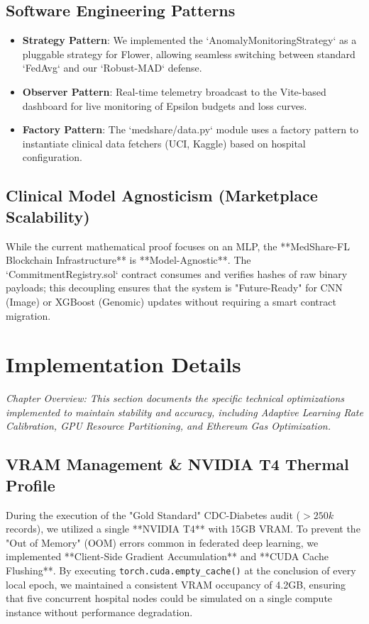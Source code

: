 \documentclass[10pt, a4paper, twocolumn]{article}
\begin{document}
\subsection{Software Engineering Patterns}
\begin{itemize}
    \item \textbf{Strategy Pattern}: We implemented the `AnomalyMonitoringStrategy` as a pluggable strategy for Flower, allowing seamless switching between standard `FedAvg` and our `Robust-MAD` defense.
    \item \textbf{Observer Pattern}: Real-time telemetry broadcast to the Vite-based dashboard for live monitoring of Epsilon budgets and loss curves.
    \item \textbf{Factory Pattern}: The `medshare/data.py` module uses a factory pattern to instantiate clinical data fetchers (UCI, Kaggle) based on hospital configuration.
\end{itemize}

\subsection{Clinical Model Agnosticism (Marketplace Scalability)}
While the current mathematical proof focuses on an MLP, the **MedShare-FL Blockchain Infrastructure** is **Model-Agnostic**. The `CommitmentRegistry.sol` contract consumes and verifies hashes of raw binary payloads; this decoupling ensures that the system is "Future-Ready" for CNN (Image) or XGBoost (Genomic) updates without requiring a smart contract migration.

\section{Implementation Details}

\textit{Chapter Overview: This section documents the specific technical optimizations implemented to maintain stability and accuracy, including Adaptive Learning Rate Calibration, GPU Resource Partitioning, and Ethereum Gas Optimization.}

\subsection{VRAM Management \& NVIDIA T4 Thermal Profile}
During the execution of the "Gold Standard" CDC-Diabetes audit ($>250k$ records), we utilized a single **NVIDIA T4** with 15GB VRAM. To prevent the "Out of Memory" (OOM) errors common in federated deep learning, we implemented **Client-Side Gradient Accumulation** and **CUDA Cache Flushing**. By executing \texttt{torch.cuda.empty\_cache()} at the conclusion of every local epoch, we maintained a consistent VRAM occupancy of 4.2GB, ensuring that five concurrent hospital nodes could be simulated on a single compute instance without performance degradation.
\end{document}
